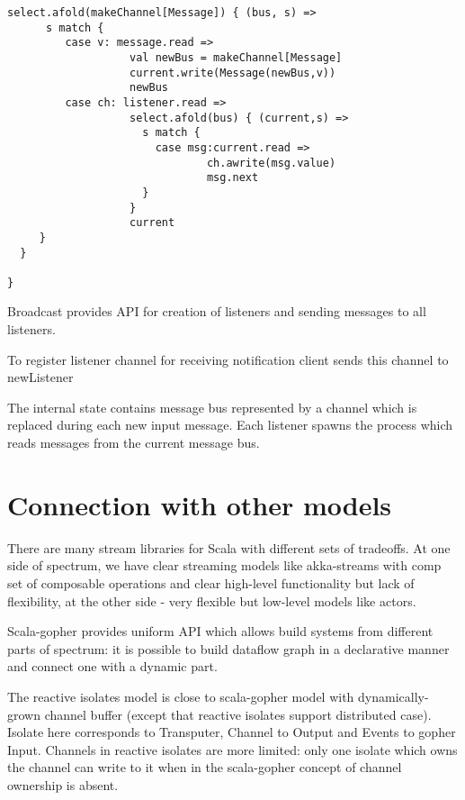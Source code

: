 \documentclass[12pt]{article}
\begin{document}
\begin{itemize}
\begin{Verbatim}[fontsize=\small]
   select.afold(makeChannel[Message]) { (bus, s) =>
      s match {
         case v: message.read =>
                   val newBus = makeChannel[Message]
                   current.write(Message(newBus,v))
                   newBus
         case ch: listener.read =>          
                   select.afold(bus) { (current,s) =>
                     s match {
                       case msg:current.read =>
                               ch.awrite(msg.value) 
                               msg.next
                     }
                   } 
                   current
     } 
  }

}
\end{Verbatim}

 Broadcast provides API for creation of listeners and sending messages to all listeners.

To register listener channel for receiving notification client sends this channel to newListener
  
 The internal state contains message bus represented by a channel which is replaced during each new input message. Each listener spawns the process which reads messages from the current message bus.


\end{itemize}

 
\section{ Connection with other models }

 There are many stream libraries for Scala with different sets of tradeoffs. At one side of
spectrum, we have clear streaming models like akka-streams\cite{akka-streams} with comp set
of composable operations and clear high-level functionality but lack of flexibility,
at the other side - very flexible but low-level models like actors.

 Scala-gopher provides uniform API which allows build systems from different parts of spectrum:
it is possible to build dataflow graph in a declarative manner and connect one with a dynamic part.

 The reactive isolates model\cite{Prokopec:2015:ICE:2814228.2814245} is close to scala-gopher model with dynamically-grown channel buffer (except that reactive isolates support distributed case).
 Isolate here corresponds to Transputer, Channel to Output and Events to gopher Input. Channels in reactive isolates are more limited: only one isolate which owns the channel can write to it when in the scala-gopher concept of channel ownership is absent. 
\end{document}
